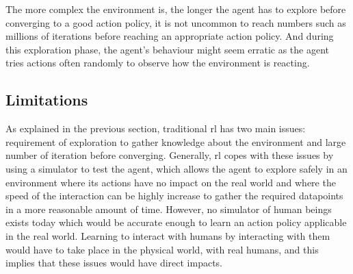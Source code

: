 	The more complex the environment is, the longer the agent has to explore before converging to a good action policy, it is not uncommon to reach numbers such as millions of iterations before reaching an appropriate action policy. And during this exploration phase, the agent's behaviour might seem erratic as the agent tries actions often randomly to observe how the environment is reacting.
	
	
\subsection{Limitations}

	As explained in the previous section, traditional \gls{rl} has two main issues: requirement of exploration to gather knowledge about the environment and large number of iteration before converging. Generally, \gls{rl} copes with these issues by using a simulator to test the agent, which allows the agent to explore safely in an environment where its actions have no impact on the real world and where the speed of the interaction can be highly increase to gather the required datapoints in a more reasonable amount of time. However, no simulator of human beings exists today which would be accurate enough to learn an action policy applicable in the real world. Learning to interact with humans by interacting with them would have to take place in the physical world, with real humans, and this implies that these issues would have direct impacts. 
	

